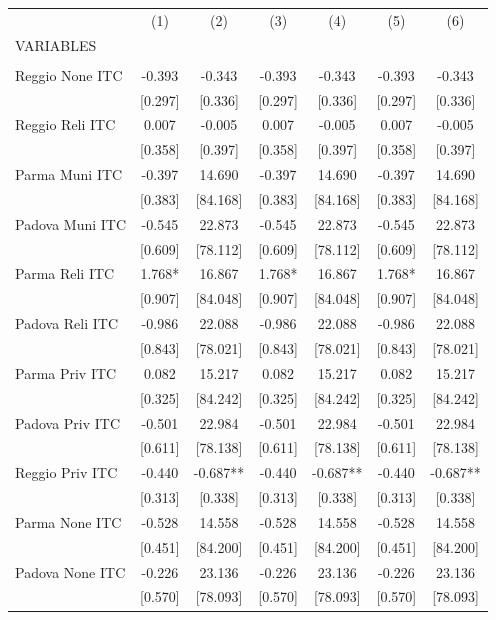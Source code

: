 \begin{tabular}{lcccccc} \hline
 & (1) & (2) & (3) & (4) & (5) & (6) \\
VARIABLES &  &  &  &  &  &  \\ \hline
 &  &  &  &  &  &  \\
Reggio None ITC & -0.393 & -0.343 & -0.393 & -0.343 & -0.393 & -0.343 \\
 & [0.297] & [0.336] & [0.297] & [0.336] & [0.297] & [0.336] \\
Reggio Reli ITC & 0.007 & -0.005 & 0.007 & -0.005 & 0.007 & -0.005 \\
 & [0.358] & [0.397] & [0.358] & [0.397] & [0.358] & [0.397] \\
Parma Muni ITC & -0.397 & 14.690 & -0.397 & 14.690 & -0.397 & 14.690 \\
 & [0.383] & [84.168] & [0.383] & [84.168] & [0.383] & [84.168] \\
Padova Muni ITC & -0.545 & 22.873 & -0.545 & 22.873 & -0.545 & 22.873 \\
 & [0.609] & [78.112] & [0.609] & [78.112] & [0.609] & [78.112] \\
Parma Reli ITC & 1.768* & 16.867 & 1.768* & 16.867 & 1.768* & 16.867 \\
 & [0.907] & [84.048] & [0.907] & [84.048] & [0.907] & [84.048] \\
Padova Reli ITC & -0.986 & 22.088 & -0.986 & 22.088 & -0.986 & 22.088 \\
 & [0.843] & [78.021] & [0.843] & [78.021] & [0.843] & [78.021] \\
Parma Priv ITC & 0.082 & 15.217 & 0.082 & 15.217 & 0.082 & 15.217 \\
 & [0.325] & [84.242] & [0.325] & [84.242] & [0.325] & [84.242] \\
Padova Priv ITC & -0.501 & 22.984 & -0.501 & 22.984 & -0.501 & 22.984 \\
 & [0.611] & [78.138] & [0.611] & [78.138] & [0.611] & [78.138] \\
Reggio Priv ITC & -0.440 & -0.687** & -0.440 & -0.687** & -0.440 & -0.687** \\
 & [0.313] & [0.338] & [0.313] & [0.338] & [0.313] & [0.338] \\
Parma None ITC & -0.528 & 14.558 & -0.528 & 14.558 & -0.528 & 14.558 \\
 & [0.451] & [84.200] & [0.451] & [84.200] & [0.451] & [84.200] \\
Padova None ITC & -0.226 & 23.136 & -0.226 & 23.136 & -0.226 & 23.136 \\
 & [0.570] & [78.093] & [0.570] & [78.093] & [0.570] & [78.093] \\

\end{tabular}
